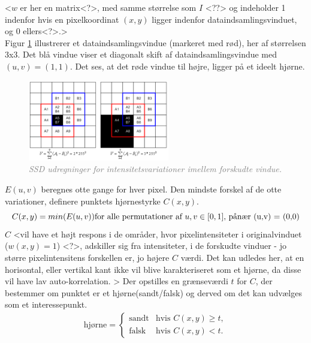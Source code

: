 <$w$ er her en matrix<?>, med samme størrelse som $I$ <??> og indeholder 1 indenfor hvis en pixelkoordinat $(x,y)$ ligger indenfor dataindsamlingsvinduet, og 0 ellers<?>.>
\\
Figur \ref{fig:moravec} illustrerer et dataindsamlingsvindue (markeret med rød), her af størrelsen 3x3. Det blå vindue viser et diagonalt skift af dataindsamlingsvindue med $(u,v)=(1,1)$. Det ses, at det røde vindue til højre, ligger på et ideelt hjørne. 
\begin{figure}[H]
    \centering
    \includegraphics[width=0.55\textwidth]{fig/25.png}
     \vspace{-1em}
    \begin{center}    
       \caption{\textcolor{gray}{\footnotesize \textit{ SSD udregninger for intensitetsvariationer imellem forskudte vindue. }}}
    \label{fig:moravec}
     \end{center}
     \vspace{-2.5em}
  \end{figure} \noindent   
$E(u,v)$ beregnes otte gange for hver pixel. Den mindste forskel af de otte variationer, definere punktets hjørnestyrke $C(x,y)$.
$$
C(x,y)=min(E(u,v)) \text{$ $for alle permutationer af $u,v \in [0,1]$, pånær (u,v) = (0,0)}
$$
$C$ 
<vil have et højt respons i de områder, hvor pixelintensiteter i originalvinduet ($w(x,y) = 1$) <?>, adskiller sig fra intensiteter, i de forskudte vinduer - jo større pixelintensitens forskellen er, jo højere $C$ værdi.
Det kan udledes her, at en horisontal, eller vertikal kant ikke vil blive karakteriseret som et hjørne, da disse vil have lav auto-korrelation. >
Der opstilles en grænseværdi $t$ for $C$, der bestemmer om punktet er et hjørne(sandt/falsk) og derved om det kan udvælges som et interessepunkt.
\begin{equation}
\begin{split}
\text{hjørne} = 
\begin{cases}
\text{sandt}& \text{hvis } C(x,y)\geq t, \\
\text{falsk }& \text{hvis } C(x,y) < t.
\end{cases}
\end{split}
\label{cornerind}
\end{equation}
